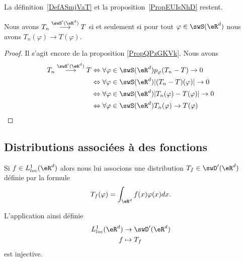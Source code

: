 \ssdem

La définition~\ref{DefASmjVaT} et la proposition~\ref{PropEUIsNhD} restent.

\begin{proposition} \label{PropQAuJstI}
	Nous avons \( T_n\stackrel{\swS'(\eR^d)}{\longrightarrow}T\) si et seulement si pour tout \( \varphi\in\swS(\eR^d)\) nous avons \( T_n(\varphi)\to T(\varphi)\).
\end{proposition}

\begin{proof}
	Il s'agit encore de la proposition \ref{PropQPzGKVk}. Nous avons
	\begin{subequations}
		\begin{align}
			T_n\stackrel{ \swS'(\eR^d)}{\longrightarrow} T & \Leftrightarrow \forall\varphi\in\swS(\eR^d)   p_{\varphi}(T_n-T)\to 0          \\
			                                               & \Leftrightarrow \forall\varphi\in\swS(\eR^d)   | (T_n-T)(\varphi) |\to 0        \\
			                                               & \Leftrightarrow \forall\varphi\in\swS(\eR^d)   | T_n(\varphi)-T(\varphi) |\to 0 \\
			                                               & \Leftrightarrow \forall\varphi\in\swS(\eR^d)   T_n(\varphi)\to T(\varphi)
		\end{align}
	\end{subequations}
\end{proof}

\subsection{Distributions associées à des fonctions}

Si \( f\in L^1_{loc}(\eR^d)\) alors nous lui associons une distribution \( T_f\in \swD'(\eR^d)\) définie par la formule
\begin{equation}
	T_f(\varphi)=\int_{\eR^d}f(x)\varphi(x)dx.
\end{equation}

\begin{proposition}
	L'application ainsi définie
	\begin{equation}
		\begin{aligned}
			L^1_{loc}(\eR^d) & \to \swD'(\eR^d) \\
			f                & \mapsto T_f
		\end{aligned}
	\end{equation}
	est injective.
\end{proposition}

